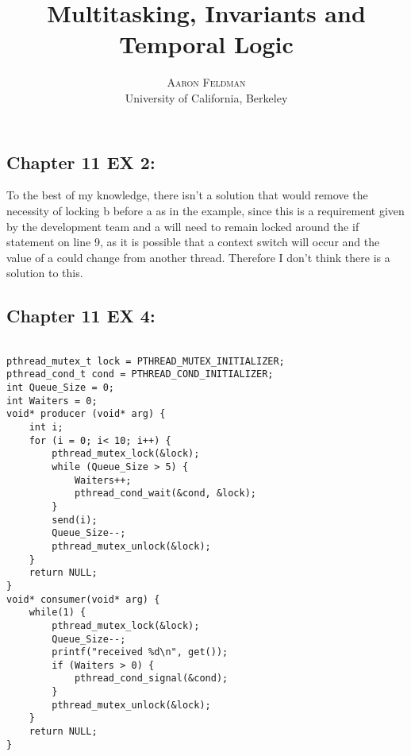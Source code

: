 \documentclass[twoside]{article}
\title{\vspace{-15mm}\fontsize{24pt}{10pt}\selectfont\textbf{Multitasking, Invariants and Temporal Logic}} %
\author{
\large
\textsc{Aaron Feldman}\\[2mm] %
\normalsize University of California, Berkeley \\ %
\vspace{-5mm}
}
\date{}
\begin{document}
\maketitle %

\thispagestyle{fancy} %





\subsection*{Chapter 11 EX 2:}
To the best of my knowledge, there isn't a solution that would remove the necessity of locking b before a as in the example, since this is a requirement given by the development team and a will need to remain locked around the if statement on line 9, as it is possible that a context switch will occur and the value of a could change from another thread. Therefore I don't think there is a solution to this.

\subsection*{Chapter 11 EX 4:}
\vspace{-5mm}
\begin{lstlisting}[mathescape, frame=single]

pthread_mutex_t lock = PTHREAD_MUTEX_INITIALIZER;
pthread_cond_t cond = PTHREAD_COND_INITIALIZER;
int Queue_Size = 0;
int Waiters = 0;
void* producer (void* arg) {
	int i;
	for (i = 0; i< 10; i++) {
		pthread_mutex_lock(&lock);
		while (Queue_Size > 5) {
			Waiters++;
			pthread_cond_wait(&cond, &lock);
		}
		send(i);
		Queue_Size--;
		pthread_mutex_unlock(&lock);
	}
	return NULL;
}
void* consumer(void* arg) {
	while(1) {
		pthread_mutex_lock(&lock);
		Queue_Size--;
		printf("received %d\n", get());
		if (Waiters > 0) {
			pthread_cond_signal(&cond);
		}
		pthread_mutex_unlock(&lock);
	}
	return NULL;
}
\end{lstlisting}
\end{document}
